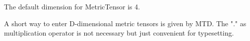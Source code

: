 



The default dimension for MetricTensor is 4.



A short way to enter D-dimensional metric tensors is given by MTD. The "." as multiplication operator is not necessary but just
  convenient for typesetting.



















